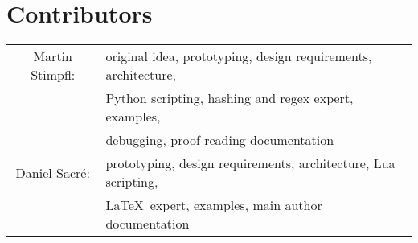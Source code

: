 \chapter{Contributors}
	\begin{longtable}[c]{cl}
		\rowcolor{white}
		Martin Stimpfl: & original idea, prototyping, design requirements, architecture, \\
						\rowcolor{white}
				       & Python scripting, hashing and regex expert, examples, \\ 
				       \rowcolor{white}
				       & debugging, proof-reading documentation\\[0.25cm]
		\rowcolor{white}
		Daniel Sacré: & prototyping, design requirements, architecture, Lua scripting, \\
						\rowcolor{white}
					  & \LaTeX~expert, examples, main author documentation
	\end{longtable}



